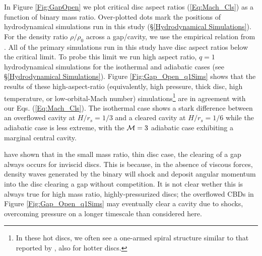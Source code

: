 In Figure \ref{Fig:GapOpen} we plot critical disc aspect ratios
(\ref{Eq:Mach_Cls}) as a function of binary mass ratio. Over-plotted dots mark
the positions of hydrodynamical simulations run in this study (\S \ref{Hydrodynamical Simulations}). For the density ratio
$\rho/\rho_0$ across a gap/cavity, we use the empirical relation from
\cite{DuffellMac:2013:smallqGapOpen}. All of the primary simulations run in 
this study have disc aspect ratios below the critical limit. 
To probe this limit we run high aspect ratio, $q=1$ hydrodynamical simulations for the
isothermal and adiabatic cases (see \S \ref{Hydrodynamical Simulations}). 
Figure \ref{Fig:Gap_Open_q1Sims} shows that the results of
these high-aspect-ratio (equivalently, high pressure, thick disc, high temperature,
or low-orbital-Mach number) simulations\footnote{In these hot discs, we often see a one-armed spiral structure similar to that reported by \cite{ShiKrolik:2015}, also for hotter discs.} are in agreement with our
Eqs. (\ref{Eq:Mach_Cls}). The isothermal case shows a stark difference between an
overflowed cavity at $H/r_s=1/3$ and a cleared cavity at $H/r_s=1/6$ while the 
adiabatic case is less extreme, with the $\mathcal{M}=3$ adiabatic case exhibiting a marginal central cavity.


\cite{DuffellMac:2013:smallqGapOpen} have shown that in the small mass ratio, thin disc case, the clearing of a gap always occurs for inviscid discs. This is because, in the absence of viscous forces, density waves generated by the binary will shock and deposit angular momentum into the disc clearing a gap without competition. It is not clear wether this is always true for high mass ratio, highly-pressurized discs; the overflowed CBDs in Figure \ref{Fig:Gap_Open_q1Sims} may eventually clear a cavity due to shocks, overcoming pressure on a longer timescale than considered here. 

